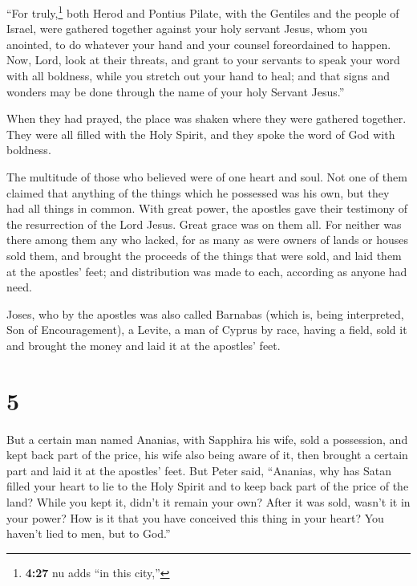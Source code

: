  ``For truly,\footnote{\textbf{4:27} nu adds ``in this
  city,''} both Herod and Pontius Pilate, with the Gentiles and the
people of Israel, were gathered together against your holy servant
Jesus, whom you anointed,  to do whatever your hand and
your counsel foreordained to happen.  Now, Lord, look at
their threats, and grant to your servants to speak your word with all
boldness,  while you stretch out your hand to heal; and
that signs and wonders may be done through the name of your holy Servant
Jesus.''

 When they had prayed, the place was shaken where they
were gathered together. They were all filled with the Holy Spirit, and
they spoke the word of God with boldness.

 The multitude of those who believed were of one heart
and soul. Not one of them claimed that anything of the things which he
possessed was his own, but they had all things in common.
 With great power, the apostles gave their testimony of
the resurrection of the Lord Jesus. Great grace was on them all.
 For neither was there among them any who lacked, for as
many as were owners of lands or houses sold them, and brought the
proceeds of the things that were sold,  and laid them at
the apostles' feet; and distribution was made to each, according as
anyone had need.

 Joses, who by the apostles was also called Barnabas
(which is, being interpreted, Son of Encouragement), a Levite, a man of
Cyprus by race,  having a field, sold it and brought the
money and laid it at the apostles' feet.

\hypertarget{section-4}{%
\section{5}\label{section-4}}

 But a certain man named Ananias, with Sapphira his wife,
sold a possession,  and kept back part of the price, his
wife also being aware of it, then brought a certain part and laid it at
the apostles' feet.  But Peter said, ``Ananias, why has
Satan filled your heart to lie to the Holy Spirit and to keep back part
of the price of the land?  While you kept it, didn't it
remain your own? After it was sold, wasn't it in your power? How is it
that you have conceived this thing in your heart? You haven't lied to
men, but to God.''

